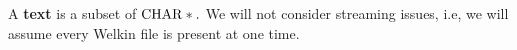 



A \textbf{text} is a subset of $\mathrm{CHAR}*.$ We will not consider streaming issues, i.e, we will assume every Welkin file is present at one time.

